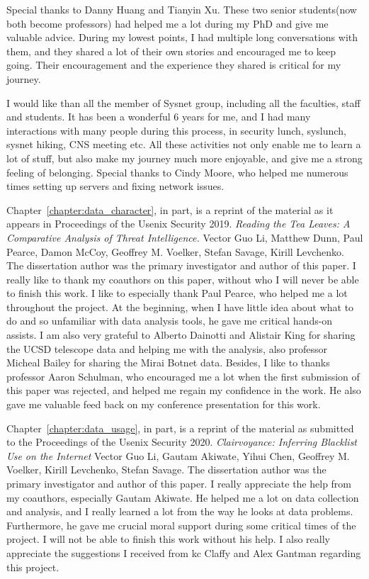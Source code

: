 \begin{acknowledgements}
Special thanks to Danny Huang and Tianyin Xu. These two senior students(now 
both become professors) had helped me a lot during my PhD and give me
valuable advice. During my lowest points, I had multiple long conversations
with them, and they shared a lot of their own stories and encouraged me to
keep going. Their encouragement and the experience they shared is critical 
for my journey.

I would like than all the member of Sysnet group, including all the faculties,
staff and students. It has been a wonderful 6 years for me, and I had many 
interactions with many people during this process, in security lunch, 
syslunch, sysnet hiking, CNS meeting etc. All these activities not only enable
me to learn a lot of stuff, but also make my journey much more enjoyable, and 
give me a strong feeling of belonging. Special thanks to Cindy Moore, who 
helped me numerous times setting up servers and fixing network issues. 

Chapter~\ref{chapter:data_character}, in part, is a reprint of the material 
as it appears in Proceedings of the Usenix Security 2019. \textit{Reading the 
Tea Leaves: A Comparative Analysis of Threat Intelligence.} Vector Guo Li,
Matthew Dunn, Paul Pearce, Damon McCoy, Geoffrey M. Voelker, Stefan Savage,
Kirill Levchenko. The dissertation author was the primary investigator and 
author of this paper. I really like to thank my coauthors on this paper,
without who I will never be able to finish this work. I like to especially 
thank Paul Pearce, who helped me a lot throughout the project. At the
beginning, when I have little idea about what to do and so unfamiliar with 
data analysis tools, he gave me critical hands-on assists. I am also very
grateful to Alberto Dainotti and Alistair King for sharing the UCSD telescope
data and helping me with the analysis, also professor Micheal Bailey for 
sharing the Mirai Botnet data. Besides, I like to thanks professor Aaron 
Schulman, who encouraged me a lot when the first submission of this paper 
was rejected, and helped me regain my confidence in the work. He also gave 
me valuable feed back on my conference presentation for this work.

Chapter~\ref{chapter:data_usage}, in part, is a reprint of the material as 
submitted to the Proceedings of the Usenix Security 2020. \textit{
Clairvoyance: Inferring Blacklist Use on the Internet} Vector Guo Li, 
Gautam Akiwate, Yihui Chen, Geoffrey M. Voelker, Kirill Levchenko, Stefan 
Savage. The dissertation author was the primary investigator and author of 
this paper. I really appreciate the help from my coauthors, especially 
Gautam Akiwate. He helped me a lot on data collection and analysis,
and I really learned a lot from the way he looks at data problems. 
Furthermore, he gave me crucial moral support during some critical times
of the project. I will not be able to finish this work without his help.
I also really appreciate the suggestions I received from kc Claffy and 
Alex Gantman regarding this project.


\end{acknowledgements}
